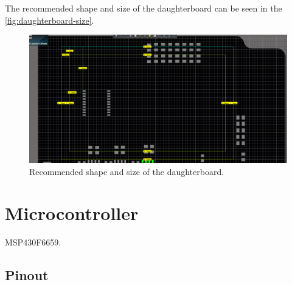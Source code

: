 The recommended shape and size of the daughterboard can be seen in the \autoref{fig:daughterboard-size}.

\begin{figure}[!ht]
    \begin{center}
        \includegraphics[width=\textwidth]{figures/daughterboard_size.png}
        \caption{Recommended shape and size of the daughterboard.}
        \label{fig:daughterboard-size}
    \end{center}
\end{figure}

\section{Microcontroller}

MSP430F6659.

\subsection{Pinout}

